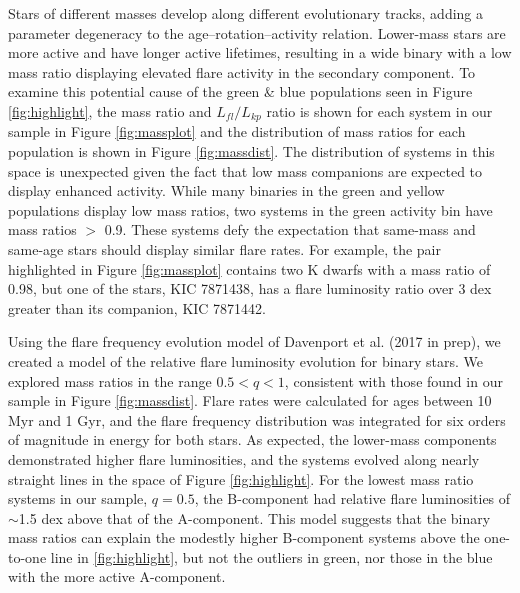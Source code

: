 \documentclass[preprint2]{aastex61}
\begin{document}
Stars of different masses develop along different evolutionary tracks, adding a parameter degeneracy to the age--rotation--activity relation. Lower-mass stars are more active and have longer active lifetimes, resulting in a wide binary with a low mass ratio displaying elevated flare activity in the secondary component. To examine this potential cause of the green \& blue populations seen in Figure \ref{fig:highlight}, the mass ratio and $L_{fl}/L_{kp}$ ratio is shown for each system in our sample in Figure \ref{fig:massplot} and the distribution of mass ratios for each population is shown in Figure \ref{fig:massdist}. The distribution of systems in this space is unexpected given the fact that low mass companions are expected to display enhanced activity. While many binaries in the green and yellow populations display low mass ratios, two systems in the green activity bin have mass ratios $>$ 0.9. These systems defy the expectation that same-mass and same-age stars should display similar flare rates. For example, the pair highlighted in Figure \ref{fig:massplot} contains two K dwarfs with a mass ratio of 0.98, but one of the stars, KIC 7871438, has a flare luminosity ratio over 3 dex greater than its companion, KIC 7871442. 




Using the flare frequency evolution model of Davenport et al. (2017 in prep), we created a model of the relative flare luminosity evolution for binary stars. We explored mass ratios in the range $0.5<q<1$, consistent with those found in our sample in Figure \ref{fig:massdist}. Flare rates were calculated for ages between 10 Myr and 1 Gyr, and the flare frequency distribution was integrated for six orders of magnitude in energy for both stars. As expected, the lower-mass components demonstrated higher flare luminosities, and the systems evolved along nearly straight lines in the space of Figure \ref{fig:highlight}. For the lowest mass ratio systems in our sample, $q=0.5$, the B-component had relative flare luminosities of $\sim$1.5 dex above that of the A-component. This model suggests that the binary mass ratios can explain the modestly higher B-component systems above the one-to-one line in \ref{fig:highlight}, but not the outliers in green, nor those in the blue with the more active A-component. 
\end{document}
